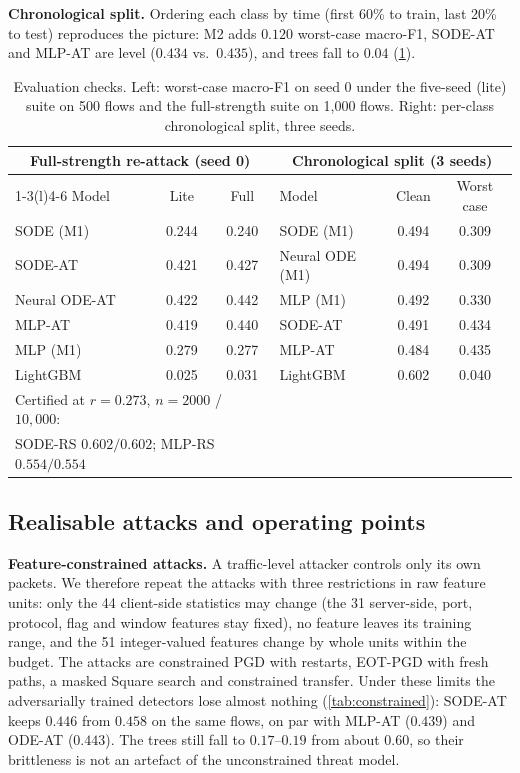 \textbf{Chronological split.} Ordering each class by time (first 60\% to train,
last 20\% to test) reproduces the picture: M2 adds $0.120$ worst-case macro-F1,
SODE-AT and MLP-AT are level ($0.434$ vs.\ $0.435$), and trees fall to $0.04$
(\cref{tab:checks}).

\begin{table}[t]
\caption{Evaluation checks. Left: worst-case macro-F1 on seed 0 under the five-seed
(lite) suite on 500 flows and the full-strength suite on 1{,}000 flows. Right:
per-class chronological split, three seeds.}
\label{tab:checks}
\centering\small\setlength{\tabcolsep}{4pt}
\begin{tabular}{lcc@{\hspace{18pt}}lcc}
\toprule
\multicolumn{3}{c}{Full-strength re-attack (seed 0)} & \multicolumn{3}{c}{Chronological split (3 seeds)}\\
\cmidrule(r){1-3}\cmidrule(l){4-6}
Model & Lite & Full & Model & Clean & Worst case\\
\midrule
SODE (M1) & 0.244 & 0.240 & SODE (M1) & 0.494 & 0.309\\
SODE-AT & 0.421 & 0.427 & Neural ODE (M1) & 0.494 & 0.309\\
Neural ODE-AT & 0.422 & 0.442 & MLP (M1) & 0.492 & 0.330\\
MLP-AT & 0.419 & 0.440 & SODE-AT & 0.491 & 0.434\\
MLP (M1) & 0.279 & 0.277 & MLP-AT & 0.484 & 0.435\\
LightGBM & 0.025 & 0.031 & LightGBM & 0.602 & 0.040\\
\midrule
\multicolumn{3}{l}{Certified at $r=0.273$, $n=2000$ / $10{,}000$:} & & & \\
\multicolumn{3}{l}{\quad SODE-RS $0.602/0.602$; MLP-RS $0.554/0.554$} & & & \\
\bottomrule
\end{tabular}
\end{table}

\subsection{Realisable attacks and operating points}
\textbf{Feature-constrained attacks.} A traffic-level attacker controls only its
own packets. We therefore repeat the attacks with three restrictions in raw
feature units: only the 44 client-side statistics may change (the 31
server-side, port, protocol, flag and window features stay fixed), no feature
leaves its training range, and the 51 integer-valued features change by whole
units within the budget. The attacks are constrained PGD with restarts, EOT-PGD with fresh paths, a masked
Square search and constrained transfer. Under these limits the adversarially
trained detectors lose almost nothing (\cref{tab:constrained}): SODE-AT keeps
$0.446$ from $0.458$ on the same flows, on par with MLP-AT ($0.439$) and
ODE-AT ($0.443$). The trees still fall to $0.17$--$0.19$ from about $0.60$, so
their brittleness is not an artefact of the unconstrained threat model.

